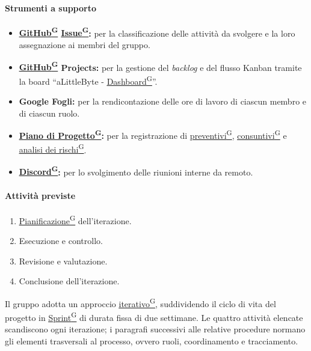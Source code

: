 \documentclass[a4paper,12pt]{article}
\providecommand{\glslink}[2]{\href{https://alittlebyte-19.github.io/Documentazione/glossario.html\#gls-#1}{\underline{#2}\textsuperscript{\scriptsize G}}}
\begin{document}
\paragraph{Strumenti a supporto}
\begin{itemize}
    \item \textbf{\glslink{github}{GitHub} \glslink{issue}{Issue}:} per la classificazione delle attività da svolgere e la loro assegnazione ai membri del gruppo.
    \item \textbf{\glslink{github}{GitHub} Projects:} per la gestione del \textit{backlog} e del flusso Kanban tramite la board ``aLittleByte - \glslink{dashboard}{Dashboard}''.
    \item \textbf{Google Fogli:} per la rendicontazione delle ore di lavoro di ciascun membro e di ciascun ruolo.
    \item \textbf{\glslink{piano-di-progetto}{Piano di Progetto}:} per la registrazione di \glslink{preventivo}{preventivi}, \glslink{consuntivo}{consuntivi} e \glslink{analisi-dei-rischi}{analisi dei rischi}.
    \item \textbf{\glslink{discord}{Discord}:} per lo svolgimento delle riunioni interne da remoto.
\end{itemize}

\paragraph{Attività previste}
\begin{enumerate}
    \item \glslink{pianificazione}{Pianificazione} dell'iterazione.
    \item Esecuzione e controllo.
    \item Revisione e valutazione.
    \item Conclusione dell'iterazione.
\end{enumerate}

Il gruppo adotta un approccio \glslink{agile}{iterativo}, suddividendo il ciclo di vita del progetto in \glslink{sprint}{Sprint} di durata fissa di due settimane. Le quattro attività elencate scandiscono ogni iterazione; i paragrafi successivi alle relative procedure normano gli elementi trasversali al processo, ovvero ruoli, coordinamento e tracciamento.
\end{document}
